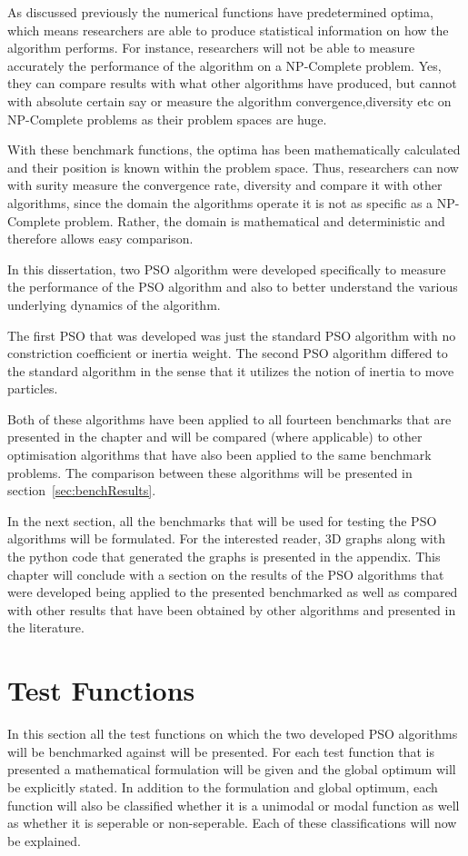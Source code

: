 As discussed previously the numerical functions have predetermined optima, which means researchers are able to produce statistical information on how the algorithm performs. For instance, researchers will not be able to measure accurately the performance of the algorithm on a NP-Complete problem\cite{CompuIntelligenceIntro,FundamentalSwarm}. Yes, they can compare results with what other algorithms have produced, but cannot with absolute certain say or measure the algorithm convergence,diversity etc on NP-Complete problems as their problem spaces are huge\cite{evalevoalgo}. 

With these benchmark functions, the optima has been mathematically calculated and their position is known within the problem space\cite{evalevoalgo}. Thus, researchers can now with surity measure the convergence rate, diversity and compare it with other algorithms, since the domain the algorithms operate it is not as specific as a NP-Complete problem\cite{evalevoalgo}. Rather, the domain is mathematical and deterministic and therefore allows easy comparison\cite{evalevoalgo}.

In this dissertation, two PSO algorithm were developed specifically to measure the performance of the PSO algorithm and also to better understand the various underlying dynamics of the algorithm.

The first PSO that was developed was just the standard PSO algorithm with no constriction coefficient or inertia weight. The second PSO algorithm differed to the standard algorithm in the sense that it utilizes the notion of inertia to move particles. 

Both of these algorithms have been applied to all fourteen benchmarks that are presented in the chapter and will be compared (where applicable) to other optimisation algorithms that have also been applied to the same benchmark problems. The comparison between these algorithms will be presented in section~\ref{sec:benchResults}.

In the next section, all the benchmarks that will be used for testing the PSO algorithms will be formulated. For the interested reader, 3D graphs along with the python code that generated the graphs is presented in the appendix. This chapter will conclude with a section on the results of the PSO algorithms that were developed being applied to the presented benchmarked as well as compared with other results that have been obtained by other algorithms and presented in the literature.
\section{Test Functions}
In this section all the test functions on which the two developed PSO algorithms will be benchmarked against will be presented. For each test function that is presented a mathematical formulation will be given and the global optimum will be explicitly stated. In addition to the formulation and global optimum, each function will also be classified whether it is a unimodal or modal function as well as whether it is seperable or non-seperable. Each of these classifications will now be explained.

